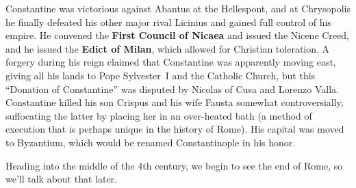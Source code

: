 Constantine was victorious against Abantus at the Hellespont,
and at Chrysopolis he finally defeated his other major rival Licinius
and gained full control of his empire.
He convened the \textbf{First Council of Nicaea} and issued the Nicene Creed,
and he issued the \textbf{Edict of Milan}, which allowed for Christian toleration.
A forgery during his reign claimed that Constantine was apparently moving east,
giving all his lands to Pope Sylvester~I and the Catholic Church,
but this ``Donation of Constantine'' was disputed by Nicolas of Cusa and Lorenzo Valla.
Constantine killed his son Crispus and his wife Fausta somewhat controversially,
suffocating the latter by placing her in an over-heated bath
(a method of execution that is perhaps unique in the history of Rome).
His capital was moved to Byzantium, which would be renamed Constantinople in his honor.

Heading into the middle of the 4th century, we begin to see the end of Rome,
so we'll talk about that later.

